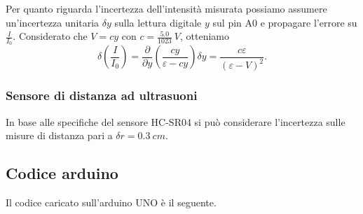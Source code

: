 \documentclass[11pt]{article}
\begin{document}
Per quanto riguarda l'incertezza dell'intensità misurata possiamo
assumere un'incertezza unitaria \(\delta y\) sulla lettura digitale
\(y\) sul pin A0 e propagare l'errore su \(\frac{I}{I_0}\). Considerato
che \(V=cy\) con \(c=\frac{5.0}{1023}\:V\), otteniamo
\[\delta\left(\frac{I}{I_0}\right)=\frac{\partial}{\partial y}\left(\frac{cy}{\varepsilon-cy}\right)\delta y=\frac{c\varepsilon}{(\varepsilon-V)^2}.\]

\hypertarget{sensore-di-distanza-ad-ultrasuoni}{%
\subsubsection{Sensore di distanza ad
ultrasuoni}\label{sensore-di-distanza-ad-ultrasuoni}}

In base alle specifiche del sensore HC-SR04 si può considerare
l'incertezza sulle misure di distanza pari a \(\delta r=0.3\: cm\).

    \hypertarget{codice-arduino}{%
\subsection{Codice arduino}\label{codice-arduino}}

Il codice caricato sull'arduino UNO è il seguente.
\end{document}
